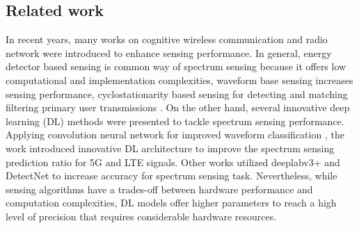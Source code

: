 \documentclass[journal]{IEEEtran} %
\begin{document}
\subsection{Related work}
In recent years, many works on cognitive wireless communication and radio network  were introduced to enhance sensing performance. In general, energy detector based sensing is common way of spectrum sensing because it offers low computational and implementation complexities, waveform base sensing increases sensing performance, cyclostationarity based sensing for detecting and matching filtering  primary user transmissions \cite{YucekSpectrumSensing}. On the other hand, several innovative deep learning (DL) methods were presented to tackle spectrum sensing performance. Applying convolution neural network for improved waveform classification \cite{huynh2024improved}, the work \cite{huynhthe2023intelligence} introduced innovative DL architecture to improve the spectrum sensing prediction ratio for 5G and LTE signals. Other works utilized deeplabv3+ \cite{nguyen2023accurate} and DetectNet \cite{gao2019deep} to increase accuracy for spectrum sensing task. Nevertheless, while sensing algorithms have a trades-off between hardware performance and computation complexities, DL models offer higher parameters to reach a high level of precision that requires considerable hardware resources.
\end{document}
